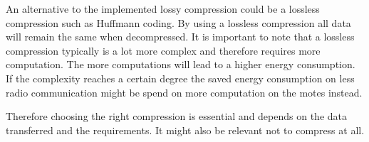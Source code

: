 An alternative to the implemented lossy compression could be a lossless compression such as Huffmann coding. By using a lossless compression all data will remain the same when decompressed. It is important to note that a lossless compression typically is a lot more complex and therefore requires more computation. The more computations will lead to a higher energy consumption. If the complexity reaches a certain degree the saved energy consumption on less radio communication might be spend on more computation on the motes instead.

Therefore choosing the right compression is essential and depends on the data transferred and the requirements. It might also be relevant not to compress at all.


